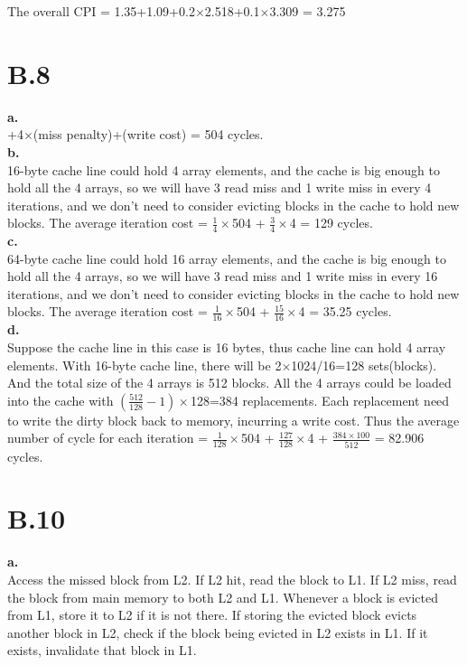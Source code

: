 \documentclass{article}
\begin{document}
\indent The overall CPI = 1.35+1.09+0.2$\times$2.518+0.1$\times$3.309 = 3.275

\section{B.8}
\indent \textbf{a.}\\
+4$\times$(miss penalty)+(write cost) = 504 cycles.\\

\noindent\textbf{b.}\\
 16-byte cache line could hold 4 array elements, and the cache is big enough to hold all the 4 arrays, so we will have 3 read miss and 1 write miss in every 4 iterations, and we don't need to consider evicting blocks in the cache to hold new blocks. The average iteration cost = $\frac{1}{4}\times$504 + $\frac{3}{4}\times$4 = 129 cycles.\\

\noindent\textbf{c.}\\
 64-byte cache line could hold 16 array elements, and the cache is big enough to hold all the 4 arrays, so we will have 3 read miss and 1 write miss in every 16 iterations, and we don't need to consider evicting blocks in the cache to hold new blocks. The average iteration cost = $\frac{1}{16}\times$504 + $\frac{15}{16}\times$4 = 35.25 cycles.\\

\noindent\textbf{d.}\\
\indent Suppose the cache line in this case is 16 bytes, thus cache line can hold 4 array elements. With 16-byte cache line, there will be 2$\times$1024/16=128 sets(blocks). And the total size of the 4 arrays is 512 blocks. All the 4 arrays could be loaded into the cache with $\left(\frac{512}{128}-1\right)\times$128=384 replacements. Each replacement need to write the dirty block back to memory, incurring a write cost. Thus the average number of cycle for each iteration = $\frac{1}{128}\times$504 + $\frac{127}{128}\times$4 + $\frac{384\times 100}{512}$ = 82.906 cycles.\\

\section{B.10}
\noindent \textbf{a.}\\
\indent Access the missed block from L2. If L2 hit, read the block to L1. If L2 miss, read the block from main memory to both L2 and L1. Whenever a block is evicted from L1, store it to L2 if it is not there. If storing the evicted block evicts another block in L2, check if the block being evicted in L2 exists in L1. If it exists, invalidate that block in L1.
\end{document}
